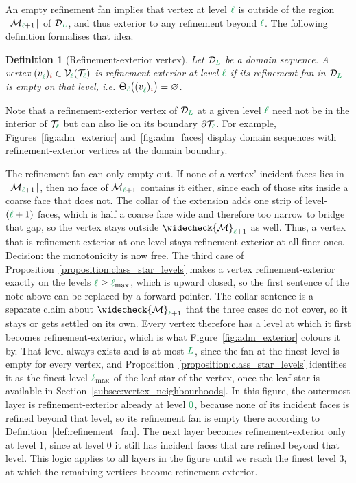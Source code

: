 \documentclass[a4paper, 12pt]{article}
\makeatletter
\newcommand{\robert}[1]{{\color{orange} #1}}
\newcommand{\lmax}{\l_{\max}}
\newcommand{\guidance}[1]{{\color{lime!70!black} #1}}
\newcommand{\green}{\color{ForestGreen}}
\newcommand{\brickred}{\color{BrickRed}}
\newcommand{\T}{\mathcal{T}}
\newcommand{\V}{\mathcal{V}}
\newcommand{\vertex}[2]{\freeQ{v}{}{#1}{#2}}
\newcommand{\coarseIdxone}{{\brickred i}}
\renewcommand{\l}{{\green\ell}}
\renewcommand{\L}{{\green L}}
\newcommand{\lzero}{{\green 0}}
\newcommand{\freeQ}[4]{ ( {#1}^{#2}_{#3} )_{#4}}
\newcommand{\M}{\mathcal{M}}
\newtheorem{definition}[theorem]{Definition}
\theoremstyle{definition}
\theoremstyle{plain}
\numberwithin{equation}{section}
\newcommand{\extendedPatch}[1]{\widecheck{#1}}
\newcommand{\ancestorPatch}[1]{\lceil #1 \rceil}
\DeclareRobustCommand{\domseq}[1][]{\mathcal{D}\ifx\@empty#1\@empty\else_{#1}\fi}
\newcommand{\refFan}[1]{\Theta_{#1}}                        %
\makeatother
\begin{document}
An empty refinement fan implies that vertex at level $\l$ is outside of the region $\ancestorPatch{\M_{\l+1}}$ of $\domseq[\L]$, and thus exterior to any refinement beyond $\l$. The following definition formalises that idea.

\begin{definition}[Refinement-exterior vertex]
    \label{def:refinement_exterior_vertex}
    Let $\domseq[\L]$ be a domain sequence. A vertex $\vertex{\l}{\coarseIdxone} \in \V_\l(\T_\l)$ is \emph{refinement-exterior} at level $\l$ if its refinement fan in $\domseq[\L]$ is empty on that level, i.e. $\refFan{\l} \big( \vertex{\l}{\coarseIdxone} \big) = \varnothing$.
\end{definition}

Note that a refinement-exterior vertex of $\domseq[\L]$ at a given level $\l$ need not be in the interior of $\T_\l$ but can also lie on its boundary $\partial \T_\l$. For example, Figures~\ref{fig:adm_exterior} and~\ref{fig:adm_faces} display domain sequences with refinement-exterior vertices at the domain boundary.

The refinement fan can only empty out. \guidance{If none of a vertex' incident faces lies in $\ancestorPatch{\M_{\l+1}}$, then no face of $\M_{\l+1}$ contains it either, since each of those sits inside a coarse face that does not. The collar of the extension adds one strip of level-$(\l+1)$ faces, which is half a coarse face wide and therefore too narrow to bridge that gap, so the vertex stays outside $\extendedPatch{\M}_{\l+1}$ as well.} Thus, a vertex that is refinement-exterior at one level stays refinement-exterior at all finer ones. \guidance{Decision: the monotonicity is now free. The third case of Proposition~\ref{proposition:class_star_levels} makes a vertex refinement-exterior exactly on the levels $\l \geq \lmax$, which is upward closed, so the first sentence of the note above can be replaced by a forward pointer. The collar sentence is a separate claim about $\extendedPatch{\M}_{\l+1}$ that the three cases do not cover, so it stays or gets settled on its own.} Every vertex therefore has a level at which it first becomes refinement-exterior, which is what Figure~\ref{fig:adm_exterior} colours it by. \robert{That level always exists and is at most $\L$, since the fan at the finest level is empty for every vertex, and Proposition~\ref{proposition:class_star_levels} identifies it as the finest level $\lmax$ of the leaf star of the vertex, once the leaf star is available in Section~\ref{subsec:vertex_neighbourhoods}.} In this figure, the outermost layer is refinement-exterior already at level $\lzero$, because none of its incident faces is refined beyond that level, so its refinement fan is empty there according to Definition~\ref{def:refinement_fan}. The next layer becomes refinement-exterior only at level $1$, since at level $0$ it still has incident faces that are refined beyond that level. This logic applies to all layers in the figure until we reach the finest level $3$, at which the remaining vertices become refinement-exterior.
\end{document}
